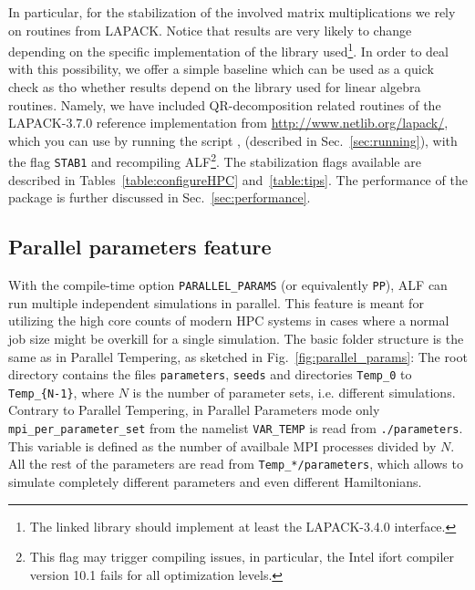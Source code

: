 In particular, for the stabilization of the involved matrix multiplications we rely on routines from LAPACK. Notice that results are very likely to change
depending on the specific implementation of the library used\footnote{The linked library should implement at least the LAPACK-3.4.0 interface.}. In order to deal with this possibility, we offer a simple baseline which can be used as a quick check as tho whether results depend on the library used for linear algebra routines. Namely, we have included QR-decomposition related routines of the LAPACK-3.7.0 reference implementation from \url{http://www.netlib.org/lapack/}, which you can use by running the script , (described in Sec.~\ref{sec:running}), with the flag \texttt{STAB1} and recompiling ALF\footnote{This flag may trigger compiling issues, in particular, the Intel ifort compiler version 10.1 fails for all optimization levels.}. The stabilization flags available are described in Tables~\ref{table:configureHPC} and~\ref{table:tips}. The performance of the package is further discussed in Sec.~\ref{sec:performance}.


%
\subsection{Parallel parameters feature} \label{sec:parallel_params}
%
With the compile-time option \verb|PARALLEL_PARAMS| (or equivalently \verb|PP|), ALF can run multiple independent simulations in parallel. This feature is meant for utilizing the high core counts of modern HPC systems in cases where a normal job size might be overkill for a single simulation. The basic folder structure is the same as in Parallel Tempering, as sketched in Fig.~\ref{fig:parallel_params}: The root directory contains the files \verb|parameters|, \verb|seeds| and directories \verb|Temp_0| to \verb|Temp_{N-1}|, where $N$ is the number of parameter sets, i.e. different simulations. Contrary to Parallel Tempering, in Parallel Parameters mode only \verb|mpi_per_parameter_set| from the namelist \verb|VAR_TEMP| is read from \verb|./parameters|. This variable is defined as the number of availbale MPI processes divided by $N$. All the rest of the parameters are read from \verb|Temp_*/parameters|, which allows to simulate completely different parameters and even different Hamiltonians.

